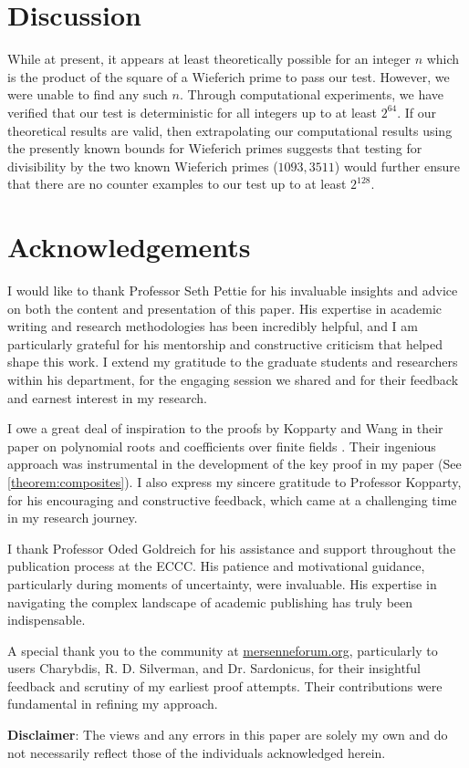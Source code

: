 \documentclass{article}
\theoremstyle{plain}
\theoremstyle{definition}
\begin{document}
\section{Discussion}
While at present, it appears at least theoretically possible for an integer $n$ which is the product of the square of a Wieferich prime to pass our test. However, we were unable to find any such $n$. Through computational experiments, we have verified that our test is deterministic for all integers up to at least $2^{64}$. If our theoretical results are valid, then extrapolating our computational results using the presently known bounds for Wieferich primes \cite{primegridww} suggests that testing for divisibility by the two known Wieferich primes ($1093, 3511$) would further ensure that there are no counter examples to our test up to at least $2^{128}$.

\section{Acknowledgements}
I would like to thank Professor Seth Pettie for his invaluable insights and advice on both the content and presentation of this paper. His expertise in academic writing and research methodologies has been incredibly helpful, and I am particularly grateful for his mentorship and constructive criticism that helped shape this work. I extend my gratitude to the graduate students and researchers within his department, for the engaging session we shared and for their feedback and earnest interest in my research.

I owe a great deal of inspiration to the proofs by Kopparty and Wang in their paper on polynomial roots and coefficients over finite fields \cite{koppartywang2014roots}. Their ingenious approach was instrumental in the development of the key proof in my paper (See \cref{theorem:composites}). I also express my sincere gratitude to Professor Kopparty, for his encouraging and constructive feedback, which came at a challenging time in my research journey.

I thank Professor Oded Goldreich for his assistance and support throughout the publication process at the ECCC. His patience and motivational guidance, particularly during moments of uncertainty, were invaluable. His expertise in navigating the complex landscape of academic publishing has truly been indispensable.

A special thank you to the community at \url{mersenneforum.org}, particularly to users Charybdis, R. D. Silverman, and Dr. Sardonicus, for their insightful feedback and scrutiny of my earliest proof attempts. Their contributions were fundamental in refining my approach.

\textbf{Disclaimer}: The views and any errors in this paper are solely my own and do not necessarily reflect those of the individuals acknowledged herein.

\begingroup
\raggedright


\endgroup
\end{document}
